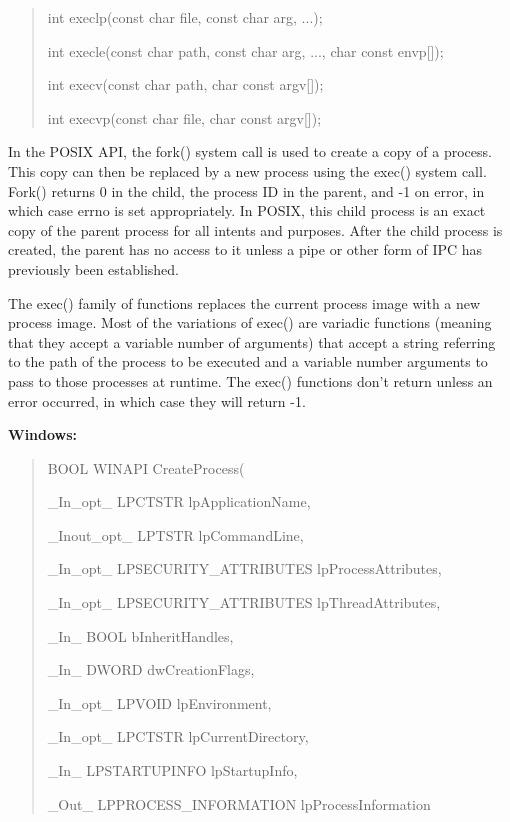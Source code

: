 \documentclass[letterpaper,10pt,titlepage]{article}
\newcommand{\tab}{\hspace*{2em}} %
\begin{document}
\begin{enumerate}
\begin{quote}
int execlp(const char \*file, const char \*arg, ...);

int execle(const char \*path, const char \*arg, ..., char \*const envp[]);

int execv(const char \*path, char \*const argv[]);

int execvp(const char \*file, char \*const argv[]);
\end{quote}


\tab In the POSIX API, the fork() system call is used to create a copy of a process. This copy can then be replaced by a new process using the exec() system call. Fork() returns 0 in the child, the process ID in the parent, and -1 on error, in which case errno is set appropriately. In POSIX, this child process is an exact copy of the parent process for all intents and purposes. After the child process is created, the parent has no access to it unless a pipe or other form of IPC has previously been established. \newline

\tab The exec() family of functions replaces the current process image with a new process image. Most of the variations of exec() are variadic functions (meaning that they accept a variable number of arguments) that accept a string referring to the path of the process to be executed and a variable number arguments to pass to those processes at runtime. The exec() functions don't return unless an error occurred, in which case they will return -1. \newline


\textbf{Windows:} 

\begin{quote}
BOOL WINAPI CreateProcess(

\tab\_In\_opt\_     LPCTSTR lpApplicationName,

\tab\_Inout\_opt\_  LPTSTR lpCommandLine,

\tab\_In\_opt\_     LPSECURITY\_ATTRIBUTES lpProcessAttributes,

\tab\_In\_opt\_     LPSECURITY\_ATTRIBUTES lpThreadAttributes,

\tab\_In\_         BOOL bInheritHandles,

\tab\_In\_         DWORD dwCreationFlags,

\tab\_In\_opt\_     LPVOID lpEnvironment,

\tab\_In\_opt\_     LPCTSTR lpCurrentDirectory,

\tab\_In\_         LPSTARTUPINFO lpStartupInfo,

\tab\_Out\_        LPPROCESS\_INFORMATION lpProcessInformation


\end{quote}
\end{enumerate}
\end{document}
